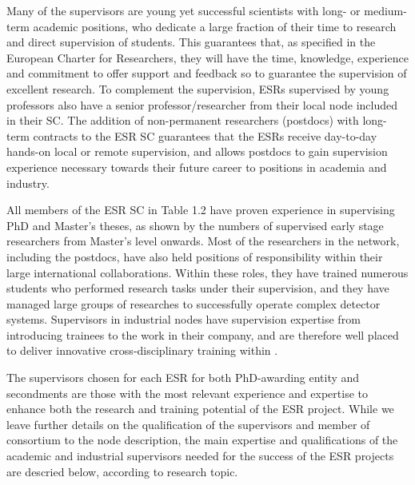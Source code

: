 Many of the supervisors are young yet successful scientists with long- or medium-term academic positions, who dedicate a large fraction of their time to research and direct supervision of students. 
This guarantees that, as specified in the European Charter for Researchers, they will have the time, knowledge, experience and commitment to offer support and feedback so to guarantee the supervision of excellent research. 
To complement the supervision, ESRs supervised by young professors also have a senior professor/researcher from their local node included in their SC.
The addition of non-permanent researchers (postdocs) with long-term contracts to the ESR SC guarantees that the ESRs receive day-to-day hands-on local or remote supervision, and allows \acronym postdocs to gain supervision experience necessary towards their future career to positions in academia and industry. 

All members of the ESR SC in Table 1.2 have proven experience in supervising PhD and Master's theses, as shown by the numbers of supervised early stage researchers from Master's level onwards. 
Most of the researchers in the network, including the postdocs, have also held positions of responsibility within their large international collaborations. 
Within these roles, they have trained numerous students who performed research tasks under their supervision, and they have managed large groups of researches to successfully operate complex detector systems. 
Supervisors in industrial nodes have supervision expertise from introducing trainees to the work in their company, and are therefore well placed to deliver innovative cross-disciplinary training within \acronym. 

The supervisors chosen for each ESR for both PhD-awarding entity and secondments are those with the most relevant experience and expertise to enhance both the research and training potential of the ESR project. 
While we leave further details on the qualification of the supervisors and member of consortium to the node description, the main expertise and qualifications of the academic and industrial supervisors needed for the success of the ESR projects are descried below, according to research topic. 

